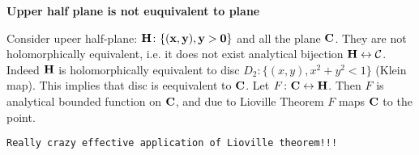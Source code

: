 
 

\baselineskip=14pt
\def\vare {\varepsilon}
\def\t {\tilde}
\def\a {\alpha}
\def\K {{\bf K}}
\def\N {{\bf N}}
\def\C {{\cal C}}
\def\L {{\cal L}}
\def\E {{\cal E}}
\def\s {{\sigma}}
\def\S {{\Sigma}}
\def\p{\partial}
\def\vare{{\varepsilon}}
\def\Q {{\bf Q}}
\def\D {{\cal D}}
\def\G {{\Gamma}}
\def\Z {{\bf Z}}
\def\R  {{\bf R}}
\def\l {\lambda}
\def\ll {{\bf l}}
\def\degree {{\bf {\rm degree}\,\,}}
\def \finish {${\,\,\vrule height1mm depth2mm width 8pt}$}
\def \m {\medskip}
\def\p {\partial}
\def\r {{\bf r}}
\def\pt {{\bf p}}
\def\v {{\bf v}}
\def\n {{\bf n}}
\def\t {{\bf t}}
\def\b {{\bf b}}
\def\c {{\bf c }}
\def\e{{\bf e}}
\def\f{{\bf f}}
\def\ac {{\bf a}}
\def \X   {{\bf X}}
\def \Y   {{\bf Y}}
\def \x   {{\bf x}}
\def \y   {{\bf y}}
\def\w {{\omega}}
\def \Tr  {{\rm Tr\,}}
\def\dim {{\rm dim\,\,}}
\def\t {{\tilde}} 
\def\dist {{\hbox{\tt "distance"}}}

  \centerline {\bf Upper half plane is not euquivalent to plane}

   Consider upeer half-plane: $\bf H\colon \{(x,y), y>0\}$
and all the plane $\bf C$.   They are not holomorphically equivalent,
i.e. it does not exist analytical 
bijection $\bf H\leftrightarrow \C$.  
Indeed $\bf H$ is holomorphically equivalent
to disc $D_2\colon \{(x,y), x^2+y^2<1\}$ (Klein map).
This implies that disc is eequivalent to $\bf C$.
Let $F\colon {\bf C}\leftrightarrow \bf H$. 
Then $F$  is analytical bounded function on $\bf C$,
and due to Lioville Theorem  $F$  maps $\bf C$  to the point.

{\tt Really crazy effective application of Lioville theorem!!!}

\bye
